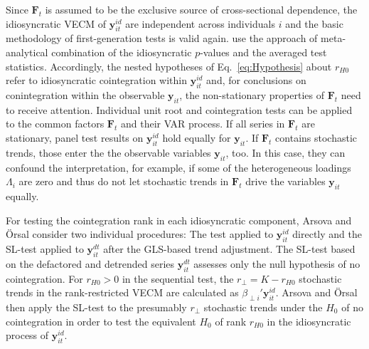 Since $ \boldsymbol{F}_t $ is assumed to be the exclusive source of cross-sectional dependence, the idiosyncratic VECM of $ \boldsymbol{y}^{i \! d}_{it} $ are independent across individuals $ i $ and the basic methodology of first-generation tests is valid again. \citet{ArsovaOersal2017} use the approach of meta-analytical combination of the idiosyncratic $p$-values and \citet{ArsovaOersal2018} the averaged test statistics. Accordingly, the nested hypotheses of Eq.~\eqref{eq:Hypothesis} about $ r_{H0} $ refer to idiosyncratic cointegration within $ \boldsymbol{y}^{i \! d}_{it} $ and, for conclusions on conintegration within the observable $ \boldsymbol{y}_{it} $, the non-stationary properties of $ \boldsymbol{F}_t $ need to receive attention. Individual unit root and cointegration tests can be applied to the common factors $ \boldsymbol{F}_t $ and their VAR process. If all series in $ \boldsymbol{F}_t $ are stationary, panel test results on $ \boldsymbol{y}^{i \! d}_{it} $ hold equally for $ \boldsymbol{y}_{it} $. If $ \boldsymbol{F}_t $ contains stochastic trends, those enter the the observable variables $ \boldsymbol{y}_{it} $, too. In this case, they can confound the interpretation, for example, if some of the heterogeneous loadings $ \Lambda_i $ are zero and thus do not let stochastic trends in $ \boldsymbol{F}_t $ drive the variables $ \boldsymbol{y}_{it} $ equally.

For testing the cointegration rank in each idiosyncratic component, Arsova and Örsal \citeyearpar{ArsovaOersal2017,ArsovaOersal2018} consider two individual procedures: The \citeauthor{Johansen1988} test applied to $ \boldsymbol{y}^{i \! d}_{it} $ directly and the SL-test applied to $ \boldsymbol{y}^{d \! t}_{it} $ after the GLS-based trend adjustment. The SL-test based on the defactored and detrended series $ \boldsymbol{y}^{d \! t}_{it} $ assesses only the null hypothesis of no cointegration. For $ r_{H0} > 0 $ in the sequential test, the $ r_\perp = K - r_{H0} $ stochastic trends in the rank-restricted VECM are calculated as $ \beta_{\perp i}' \boldsymbol{y}^{i \! d}_{it} $. Arsova and Örsal \citeyearpar{ArsovaOersal2017,ArsovaOersal2018} then apply the SL-test to the presumably $ r_\perp $ stochastic trends under the $ H_0 $ of no cointegration in order to test the equivalent $ H_0 $ of rank $ r_{H0} $ in the idiosyncratic process of $ \boldsymbol{y}^{i \! d}_{it} $. 

